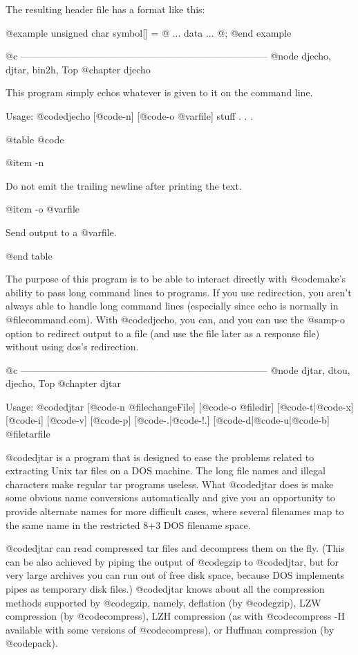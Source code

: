 The resulting header file has a format like this:

@example
unsigned char symbol[] = @{
  ... data ...
@};
@end example

@c -----------------------------------------------------------------------------
@node djecho, djtar, bin2h, Top
@chapter djecho

This program simply echos whatever is given to it on the command line.

Usage: @code{djecho} [@code{-n}] [@code{-o} @var{file}] stuff . . .

@table @code

@item -n

Do not emit the trailing newline after printing the text.

@item -o @var{file}

Send output to a @var{file}.

@end table

The purpose of this program is to be able to interact directly with
@code{make}'s ability to pass long command lines to programs.  If you
use redirection, you aren't always able to handle long command lines
(especially since echo is normally in @file{command.com}).  With
@code{djecho}, you can, and you can use the @samp{-o} option to redirect
output to a file (and use the file later as a response file) without
using dos's redirection.

@c -----------------------------------------------------------------------------
@node djtar, dtou, djecho, Top
@chapter djtar

Usage: @code{djtar} [@code{-n} @file{changeFile}] [@code{-o} @file{dir}]
[@code{-t}|@code{-x}] [@code{-i}] [@code{-v}] [@code{-p}]
[@code{-.}|@code{-!.}] [@code{-d}|@code{-u}|@code{-b}] @file{tarfile}

@code{djtar} is a program that is designed to ease the problems related
to extracting Unix tar files on a DOS machine.  The long file names and
illegal characters make regular tar programs useless.  What @code{djtar}
does is make some obvious name conversions automatically and give you an
opportunity to provide alternate names for more difficult cases, where
several filenames map to the same name in the restricted 8+3 DOS filename
space.

@code{djtar} can read compressed tar files and decompress them on the
fly.  (This can be also achieved by piping the output of @code{gzip} to
@code{djtar}, but for very large archives you can run out of free disk
space, because DOS implements pipes as temporary disk files.)
@code{djtar} knows about all the compression methods supported by
@code{gzip}, namely, deflation (by @code{gzip}), LZW compression
(by @code{compress}), LZH compression (as with @code{compress -H}
available with some versions of @code{compress}), or Huffman compression
(by @code{pack}).

